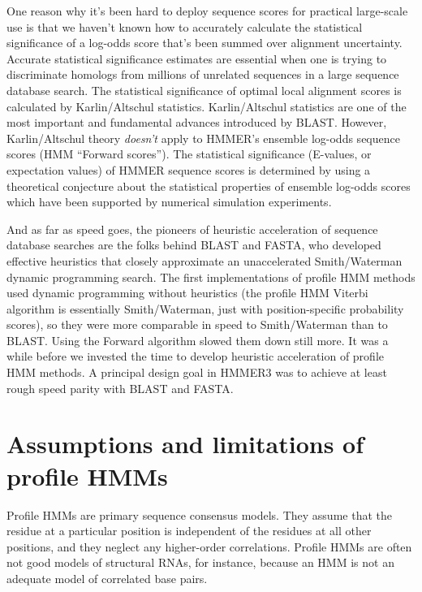 One reason why it's been hard to deploy sequence scores for practical
large-scale use is that we haven't known how to accurately calculate
the statistical significance of a log-odds score that's been summed
over alignment uncertainty. Accurate statistical significance
estimates are essential when one is trying to discriminate homologs
from millions of unrelated sequences in a large sequence database
search. The statistical significance of optimal local alignment scores
is calculated by Karlin/Altschul statistics.\cite{Karlin90}
Karlin/Altschul statistics are one of the most important and
fundamental advances introduced by BLAST.  However, Karlin/Altschul
theory \emph{doesn't} apply to HMMER's ensemble log-odds sequence
scores (HMM ``Forward scores''). The statistical significance
(E-values, or expectation values) of HMMER sequence scores is
determined by using a theoretical conjecture about the statistical
properties of ensemble log-odds scores which have been supported by
numerical simulation experiments.\cite{Eddy08}

And as far as speed goes, the pioneers of heuristic acceleration of
sequence database searches are the folks behind BLAST and FASTA, who
developed effective heuristics that closely approximate an
unaccelerated Smith/Waterman dynamic programming search.  The first
implementations of profile HMM methods used dynamic programming
without heuristics (the profile HMM Viterbi algorithm is essentially
Smith/Waterman, just with position-specific probability scores), so
they were more comparable in speed to Smith/Waterman than to BLAST.
Using the Forward algorithm slowed them down still more. It was a
while before we invested the time to develop heuristic acceleration of
profile HMM methods. A principal design goal in HMMER3 was to achieve
at least rough speed parity with BLAST and FASTA.


\section{Assumptions and limitations of profile HMMs}

Profile HMMs are primary sequence consensus models.  They assume that
the residue at a particular position is independent of the residues at
all other positions, and they neglect any higher-order correlations.
Profile HMMs are often not good models of structural RNAs, for
instance, because an HMM is not an adequate model of correlated base
pairs.

